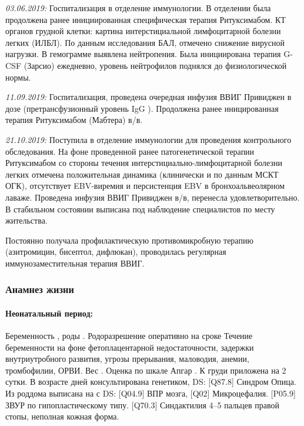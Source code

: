 \documentclass[a4paper,14pt]{extarticle}
\newcommand{\gramm}{г}
\newcommand{\grammliter}{г/л}
\newcommand{\mugpkg}{мкг/кг}
\newcommand{\mg}{мг}
\newcommand{\weeks}{нед.}
\newcommand{\pdate}[1]{\emph{#1:} }
\newcommand{\DS}[2]{[#2] #1}
\begin{document}
\pdate{03.06.2019} Госпитализация в отделение иммунологии. В отделении была продолжена ранее инициированная специфическая терапия Ритуксимабом. КТ органов грудной клетки: картина интерстициальной лимфоцитарной болезни легких (ИЛБЛ). По данным исследования БАЛ, отмечено снижение вирусной нагрузки. В гемограмме выявлена нейтропения. Была инициирована терапия G-CSF (Зарсио) \numprint[\mugpkg]{3} ежедневно, уровень нейтрофилов поднялся до физиологической нормы.

\pdate{11.09.2019} Госпитализация, проведена очередная инфузия ВВИГ Привиджен в дозе \numprint[\gramm]{10} (претрансфузионный уровень IgG \numprint[\grammliter]{5.8}). Продолжена ранее иницированная терапия Ритуксимабом (Мабтера) \numprint[\mg]{250} в/в. 

\pdate{21.10.2019} Поступила в отделение иммунологии для проведения контрольного обследования. На фоне проведенной ранее патогенетической терапии Ритуксимабом со стороны течения интерстициально\hyp{}лимфоцитарной болезни легких отмечена положительная динамика (клинически и по данным МСКТ ОГК), отсутствует EBV-виремия и персистенция EBV в бронхоальвеолярном лаваже. Проведена инфузия ВВИГ Привиджен \numprint[\gramm]{7,5} в/в, перенесла удовлетворительно. В стабильном состоянии выписана под наблюдение специалистов по месту жительства.

Постоянно получала профилактическую противомикробную терапию (азитромицин, бисептол, дифлюкан), проводилась регулярная иммунозаместительная терапия ВВИГ.

\subsubsection*{Анамнез жизни}

\paragraph{Неонатальный период:} Беременность , роды . Родоразрешение оперативно на сроке \numprint[\weeks]{38} Течение беременности на фоне фетоплацентарной недостаточности, задержки внутриутробного развития, угрозы прерывания, маловодия, анемии, тромбофилии, ОРВИ. Вес \numprint[\gramm]{2600}. Оценка по шкале Апгар . К груди приложена на 2 сутки. В возрасте  дней консультирована генетиком, DS: \DS{Синдром Опица}{Q87.8}. Из роддома выписана на  с DS: \DS{ВПР мозга}{Q04.9}, \DS{Микроцефалия}{Q02}. \DS{ЗВУР по гипопластическому типу}{P05.9}. \DS{Синдактилия 4--5 пальцев правой стопы, неполная кожная форма}{Q70.3}.
\end{document}
